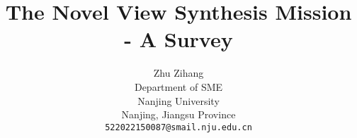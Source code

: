 \documentclass{arxiv_art/arxiv_art}
\title{The Novel View Synthesis Mission - A Survey}
\author{
    \hspace{1mm}Zhu Zihang \\
    Department of SME \\
    Nanjing University\\
    Nanjing, Jiangsu Province \\
    \texttt{522022150087@smail.nju.edu.cn}
}
\begin{document}
\maketitle 
\begin{abstract}
    
\end{abstract}
\end{document}
